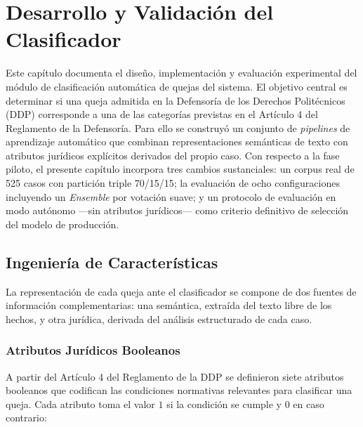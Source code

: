 \chapter{Desarrollo y Validación del Clasificador}
\label{cap:clasificador}

Este capítulo documenta el diseño, implementación y evaluación experimental
del módulo de clasificación automática de quejas del sistema. El objetivo
central es determinar si una queja admitida en la Defensoría de los Derechos
Politécnicos (DDP) corresponde a una de las categorías previstas en el
Artículo 4 del Reglamento de la Defensoría. Para ello se construyó un
conjunto de \textit{pipelines} de aprendizaje automático que combinan
representaciones semánticas de texto con atributos jurídicos explícitos
derivados del propio caso. Con respecto a la fase piloto, el presente
capítulo incorpora tres cambios sustanciales: un corpus real de 525 casos
con partición triple 70/15/15; la evaluación de ocho configuraciones
incluyendo un \textit{Ensemble} por votación suave; y un protocolo de
evaluación en modo autónomo —sin atributos jurídicos— como criterio
definitivo de selección del modelo de producción.

\section{Ingeniería de Características}
\label{sec:feature_engineering}

La representación de cada queja ante el clasificador se compone de dos
fuentes de información complementarias: una semántica, extraída del texto
libre de los hechos, y otra jurídica, derivada del análisis estructurado
de cada caso.

\subsection{Atributos Jurídicos Booleanos}
\label{subsec:campos_juridicos}

A partir del Artículo 4 del Reglamento de la DDP se definieron siete
atributos booleanos que codifican las condiciones normativas relevantes
para clasificar una queja. Cada atributo toma el valor $1$ si la condición
se cumple y $0$ en caso contrario:

